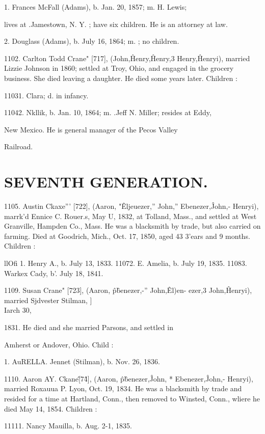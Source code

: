 1. Frances McFall (Adams), b. Jan. 20, 1857; m. H. Lewis; 

lives at .Jamestown, N. Y. ; have six children. He is an 
attorney at law. 

2. Douglass (Adams), b. July 16, 1864; m. ; no children. 

1102. Carlton Todd Crane" [717], (John,\^ Henry,\^ Henry,3 
Henry,\^ Henryi), married Lizzie Johnson in 1860; settled at 
Troy, Ohio, and engaged in the grocery business. She died 
leaving a daughter. He died some years later. Children : 

11031. Clara; d. in infancy. 

11042. Nkllik, b. Jan. 10, 1864; m. .Jeff N. Miller; resides at Eddy, 

New Mexico. He is general manager of the Pecos Valley 

Railroad. 



\section{SEVENTH GENERATION.}


1105. Austin Ckaxe''' [722], (Aaron, "\^ Eljeuezer,'' John,'' 
Ebenezer,\^ John,- Henryi), marrk'd Ennice C. Rouer.s, May U, 
1832, at Tolland, Mass., and settled at West Granville, Hampden 
Co., Mass. He was a blacksmith by trade, but also carried on 
farming. Died at Goodrich, Mich., Oct. 17, 1850, aged 43 3'ears 
and 9 months. Children : 

llOfi 1. Henry A., b. July 13, 1833. 
11072. E. Amelia, b. July 19, 1835. 
11083. Warkex Cady, b'. July 18, 1841. 

1109. Susan Crane" [723], (Aaron, \^ p\^benezer,-'' John,\^ El)en- 
ezer,3 John,\^ Henryi), married Sjdvester Stilman, ]\\Iarch 30, 

1831. He died and she married Parsons, and settled in 

Amherst or Andover, Ohio. Child : 

1. AuRELLA. Jennet (Stilman), b. Nov. 26, 1836. 

1110. Aaron AY. Ckane\^ [7\^4], (Aaron, \^ p\^benezer,\^ John, * 
Ebenezer,\^ John,- Henryi), married Roxauua P. Lyon, Oct. 19, 
1834. He was a blacksmith by trade and resided for a time at 
Hartland, Conn., then removed to Winsted, Conn., wliere he 
died May 14, 1854. Children : 

11111. Nancy Mauilla, b. Aug. 2-1, 1835. 

